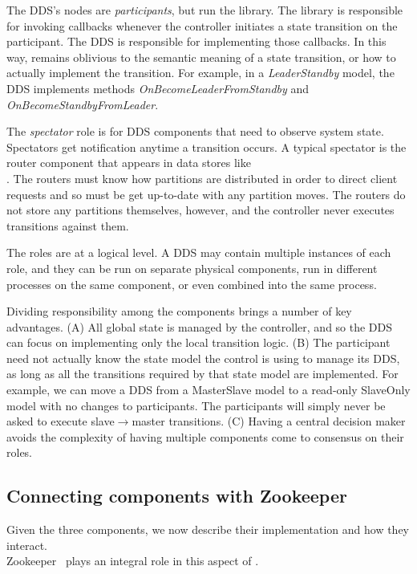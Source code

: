 The DDS's nodes are \emph{participants}, but run the \helix library.  The
library is responsible for invoking callbacks whenever the controller initiates
a state transition on the participant.  The DDS is responsible for implementing
those callbacks.  In this way, \helix remains oblivious to the semantic meaning
of a state transition, or how to actually implement the transition.  For
example, in a \emph{LeaderStandby} model, the DDS implements methods
\emph{OnBecomeLeaderFromStandby} and \emph{OnBecomeStandbyFromLeader}.

The \emph{spectator} role is for DDS components that need to observe system
state.  Spectators get notification anytime a transition occurs.  A typical
spectator is the router component that appears in data stores like \\ \ES.  The
routers must know how partitions are distributed in order to direct client
requests and so must be get up-to-date with any partition moves.  The routers do
not store any partitions themselves, however, and the controller never executes
transitions against them.

The roles are at a logical level.  A DDS may contain multiple instances of each
role, and they can be run on separate physical components, run in different
processes on the same component, or even combined into the same process.
 
Dividing responsibility among the components brings a number of key
advantages.  (A) All global state is managed by the controller, and so the DDS can
focus on implementing only the local transition logic.  (B) The participant need
not actually know the state model the control is using to manage its DDS, as long as all the
transitions required by that state model are implemented.  
For example, we can move a DDS from a MasterSlave model to a read-only SlaveOnly
model with no changes to participants.  The participants will simply never
be asked to execute slave$\rightarrow$master transitions.  (C) Having a
central decision maker avoids the complexity of having multiple components come
to consensus on their roles.    

\subsection{Connecting components with Zookeeper}

Given the three \helix components, we now describe their implementation and how
they interact. \\ Zookeeper~\cite{zookeeper} plays an integral role in this aspect
of \helix.

